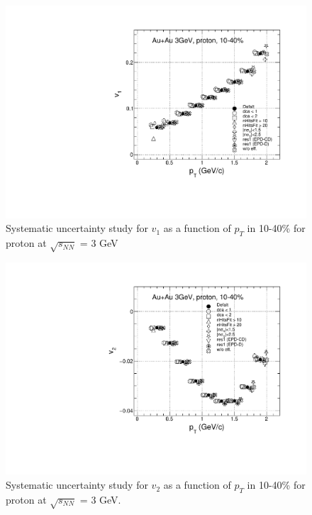 \begin{figure}[h]
\includegraphics[scale=0.4]{chapter3/fig/sys/proton/v1pt_pp_sys.pdf}
\caption{Systematic uncertainty study for $v_{1}$ as a function of $p_{T}$ in 10-40\% for proton at $\sqrt{s_{NN}}$ = 3 GeV}
\label{pion_v1y_sys}
\end{figure}

\begin{figure}[h]
\includegraphics[scale=0.4]{chapter3/fig/sys/proton/v2pt_pp_sys.pdf}
\caption{Systematic uncertainty study for $v_{2}$ as a function of $p_{T}$ in 10-40\% for proton at $\sqrt{s_{NN}}$ = 3 GeV.}
\label{pion_v1y_sys}
\end{figure}


















